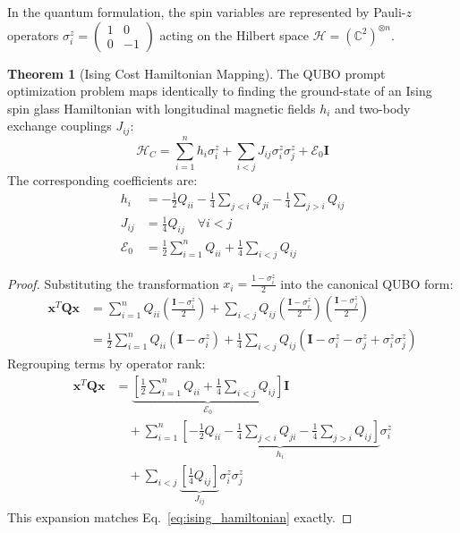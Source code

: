 \documentclass[review,12pt,times,authoryear]{elsarticle}
\theoremstyle{definition}
\newtheorem{theorem}{Theorem}[section]
\begin{document}
In the quantum formulation, the spin variables are represented by Pauli-$z$ operators $\sigma_i^z = \left(\begin{smallmatrix} 1 & 0 \\ 0 & -1 \end{smallmatrix}\right)$ acting on the Hilbert space $\mathcal{H} = (\mathbb{C}^2)^{\otimes n}$.

\begin{theorem}[Ising Cost Hamiltonian Mapping]
The QUBO prompt optimization problem maps identically to finding the ground-state of an Ising spin glass Hamiltonian with longitudinal magnetic fields $h_i$ and two-body exchange couplings $J_{ij}$:
\begin{equation}
  \mathcal{H}_C = \sum_{i=1}^n h_i \sigma_i^z + \sum_{i < j} J_{ij} \sigma_i^z \sigma_j^z + \mathcal{E}_0 \mathbf{I}
  \label{eq:ising_hamiltonian}
\end{equation}
The corresponding coefficients are:
\begin{align}
  h_i &= -\frac{1}{2} Q_{ii} - \frac{1}{4} \sum_{j < i} Q_{ji} - \frac{1}{4} \sum_{j > i} Q_{ij} \label{eq:h_field} \\
  J_{ij} &= \frac{1}{4} Q_{ij} \quad \forall i < j \label{eq:j_coupling} \\
  \mathcal{E}_0 &= \frac{1}{2} \sum_{i=1}^n Q_{ii} + \frac{1}{4} \sum_{i < j} Q_{ij} \label{eq:e_offset}
\end{align}
\end{theorem}

\begin{proof}
Substituting the transformation $x_i = \frac{1 - \sigma_i^z}{2}$ into the canonical QUBO form:
\begin{align}
  \bm{x}^T \mathbf{Q} \bm{x} &= \sum_{i=1}^n Q_{ii} \left(\frac{\mathbf{I} - \sigma_i^z}{2}\right) + \sum_{i < j} Q_{ij} \left(\frac{\mathbf{I} - \sigma_i^z}{2}\right)\left(\frac{\mathbf{I} - \sigma_j^z}{2}\right) \nonumber \\
  &= \frac{1}{2}\sum_{i=1}^n Q_{ii}(\mathbf{I} - \sigma_i^z) + \frac{1}{4}\sum_{i < j} Q_{ij}(\mathbf{I} - \sigma_i^z - \sigma_j^z + \sigma_i^z \sigma_j^z)
\end{align}
Regrouping terms by operator rank:
\begin{align}
  \bm{x}^T \mathbf{Q} \bm{x} &= \underbrace{\left[\frac{1}{2}\sum_{i=1}^n Q_{ii} + \frac{1}{4}\sum_{i < j} Q_{ij}\right]}_{\mathcal{E}_0} \mathbf{I} \nonumber \\
  &\quad + \sum_{i=1}^n \underbrace{\left[-\frac{1}{2}Q_{ii} - \frac{1}{4}\sum_{j < i} Q_{ji} - \frac{1}{4}\sum_{j > i} Q_{ij}\right]}_{h_i} \sigma_i^z \nonumber \\
  &\quad + \sum_{i < j} \underbrace{\left[\frac{1}{4}Q_{ij}\right]}_{J_{ij}} \sigma_i^z \sigma_j^z
\end{align}
This expansion matches Eq.~\eqref{eq:ising_hamiltonian} exactly.
\end{proof}
\end{document}
